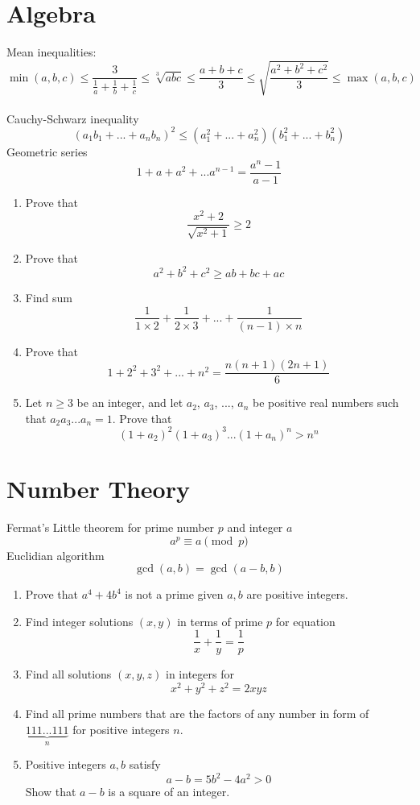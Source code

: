 \documentclass{article}
\begin{document}
	\section{Algebra}
		Mean inequalities:
		$$\min (a,b,c) \leq \frac{3}{\frac{1}{a}+\frac{1}{b}+\frac{1}{c}} \leq \sqrt[3]{abc} \leq \frac{a+b+c}{3} \leq \sqrt{\frac{a^2+b^2+c^2}{3}} \leq \max (a,b,c)$$
		\\
		Cauchy-Schwarz inequality
		$$(a_1b_1+...+a_nb_n)^2 \leq (a_1^2+...+a_n^2)(b_1^2+...+b_n^2) $$
		Geometric series
		$$ 1+a+a^2+...a^{n-1}=\frac{a^n-1}{a-1} $$
		
		
		\begin{enumerate}
		\item
		Prove that
		$$\frac{x^2+2}{\sqrt{x^2+1}} \geq 2 $$
		\item
		Prove that
		$$ a^2+b^2+c^2 \geq ab+bc+ac $$
		\item
		Find sum
		$$ \frac{1}{1 \times 2} + \frac{1}{2 \times 3} +...+ \frac{1}{(n-1)\times n} $$
		\item
		Prove that
		$$ 1+2^2+3^2+...+n^2 = \frac{n(n+1)(2n+1)}{6} $$
		\item
		Let $n \geq 3$ be an integer, and let $a_2$, $a_3$, ..., $a_n$ be positive real numbers such that $a_2a_3...a_n = 1$. Prove that
		$$(1 + a_2)^2(1 + a_3)^3...(1 + a_n)^n > n^n$$			
		\end{enumerate}
	
	\newpage
	
	\section{Number Theory}
	Fermat's Little theorem for prime number $p$ and integer $a$
	$$ a^p \equiv a  \pmod p$$
	Euclidian algorithm
	$$ \gcd(a,b)=\gcd(a-b,b)$$
	\begin{enumerate}
		\item
		Prove that $a^4+4b^4$ is not a prime given $a,b$ are positive integers.
		\item
		Find integer solutions $(x,y)$ in terms of prime $p$ for equation
		$$ \frac{1}{x}+\frac{1}{y}=\frac{1}{p} $$
		\item
		Find all solutions $(x,y,z)$ in integers for
		$$ x^2 + y^2 + z^2 = 2xyz $$ 
		\item
		Find all prime numbers that are the factors of any number in form of
		$\underbrace{111...111}_{n}$ for positive integers $n$.
		\item
		Positive integers $a,b$ satisfy
		$$ a-b = 5b^2-4a^2 > 0$$
		Show that $a-b$ is a square of an integer.
	\end{enumerate}
	
\end{document}
